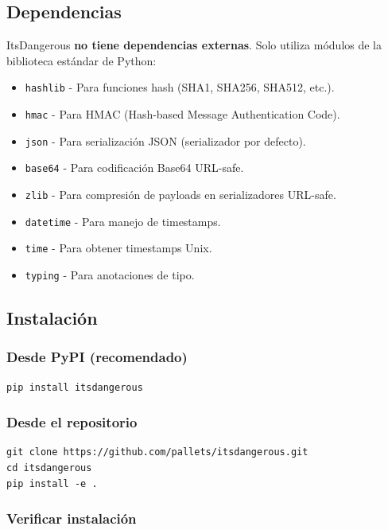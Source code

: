 \documentclass[11pt,a4paper]{article}
\begin{document}
\subsection*{Dependencias}


ItsDangerous \textbf{no tiene dependencias externas}. Solo utiliza módulos de la biblioteca estándar de Python:


\begin{itemize}[leftmargin=*,topsep=2pt,itemsep=1pt]
  \item \texttt{hashlib} - Para funciones hash (SHA1, SHA256, SHA512, etc.).
  \item \texttt{hmac} - Para HMAC (Hash-based Message Authentication Code).
  \item \texttt{json} - Para serialización JSON (serializador por defecto).
  \item \texttt{base64} - Para codificación Base64 URL-safe.
  \item \texttt{zlib} - Para compresión de payloads en serializadores URL-safe.
  \item \texttt{datetime} - Para manejo de timestamps.
  \item \texttt{time} - Para obtener timestamps Unix.
  \item \texttt{typing} - Para anotaciones de tipo.
\end{itemize}


\subsection*{Instalación}


\subsubsection*{Desde PyPI (recomendado)}


\begin{lstlisting}
pip install itsdangerous
\end{lstlisting}


\subsubsection*{Desde el repositorio}


\begin{lstlisting}
git clone https://github.com/pallets/itsdangerous.git
cd itsdangerous
pip install -e .
\end{lstlisting}


\subsubsection*{Verificar instalación}
\end{document}

